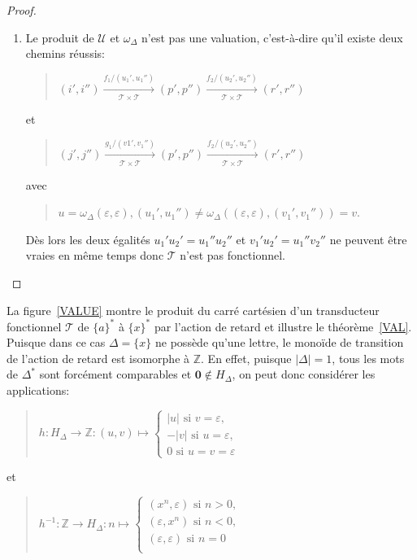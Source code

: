 \begin{proof}
\begin{description}
\begin{enumerate}
					\item Le produit de $\mathscr{U}$ et $\omega_\Delta$ n'est pas une valuation, c'est-à-dire qu'il existe deux chemins réussis:
						\begin{quotation}
							$(i',i'') \xrightarrow[\mathscr{T} \times \mathscr{T}]{f_1 / (u_1',u_1'')} (p',p'') \xrightarrow[\mathscr{T} \times \mathscr{T}]{f_2 / (u_2',u_2'')} (r',r'')$
						\end{quotation}
						et %
						\begin{quotation}
							$(j',j'') \xrightarrow[\mathscr{T} \times \mathscr{T}]{g_1 / (v1', v_1'')} (p',p'') \xrightarrow[\mathscr{T} \times \mathscr{T}]{f_2 / (u_2',u_2'')} (r',r'')$
						\end{quotation}
						avec 
						\begin{quotation}
							$u = \omega_\Delta(\varepsilon,\varepsilon), (u_1',u_1'') \neq \omega_\Delta((\varepsilon,\varepsilon),(v_1',v_1'')) = v$.
						\end{quotation}
						Dès lors les deux égalités $u_1'u_2' = u_1''u_2''$ et $v_1'u_2' = u_1''v_2''$ ne peuvent être vraies en même temps donc $\mathscr{T}$ n'est pas fonctionnel.
				\end{enumerate}
		\end{description}
	\end{proof}

	La figure~\ref{VALUE} montre le produit du carré cartésien d'un transducteur fonctionnel $\mathscr{T}$ de $\{a\}^*$ à $\{x\}^*$ par l'action de retard et illustre le théorème~\ref{VAL}. Puisque dans ce cas $\Delta = \{x\}$ ne possède qu'une lettre, le monoïde de transition de l'action de retard est isomorphe à $\mathbb{Z}$. En effet, puisque $|\Delta| = 1$, tous les mots de $\Delta^*$ sont forcément comparables et $\mathbf{0} \not\in H_\Delta$, on peut donc considérer les applications:
	\begin{quotation}
		$h: H_\Delta \to \mathbb{Z} : (u,v) \mapsto \begin{cases}
		|u| \text{ si } v = \varepsilon, \\
		-|v| \text{ si } u = \varepsilon, \\
		0 \text{ si } u = v = \varepsilon
		\end{cases}$
	\end{quotation}
	et
	\begin{quotation}
		$h^{-1}: \mathbb{Z} \to H_\Delta : n \mapsto \begin{cases}
		(x^n, \varepsilon) \text{ si } n > 0, \\
		(\varepsilon, x^n) \text{ si } n < 0, \\
		(\varepsilon, \varepsilon) \text{ si } n = 0 \\
		\end{cases}$
	\end{quotation}
	
